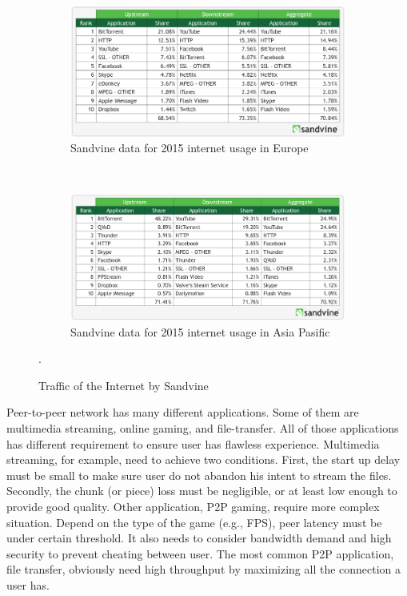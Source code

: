 \begin{figure}[h]
	\centering
	\begin{subfigure}[b]{0.8\textwidth}
		\includegraphics[width=\linewidth]{pics/sandvineeu2015}
		\caption{Sandvine data for 2015 internet usage in Europe}
		\label{fig:usage1}
	\end{subfigure}\\
	\begin{subfigure}[b]{0.8\textwidth}
		\includegraphics[width=\linewidth]{pics/sandvineasia2015}
		\caption{Sandvine data for 2015 internet usage in Asia Pasific}
		\label{fig:usage2}
	\end{subfigure}%
	\caption{Traffic of the Internet by Sandvine \cite{2015:internettraffic:sandvine}}.
	\label{fig:usage}
\end{figure}

Peer-to-peer network has many different applications. Some of them are multimedia streaming, online gaming, and file-transfer. All of those applications has different requirement to ensure user has flawless experience. Multimedia streaming, for example, need to achieve two conditions. First, the start up delay must be small to make sure user do not abandon his intent to stream the files. Secondly, the chunk (or piece) loss must be negligible, or at least low enough to provide good quality\cite{2008:givetogetvod:Mol}. Other application, P2P gaming, require more complex situation. Depend on the type of the game (e.g., FPS), peer latency must be under certain threshold\cite{2010:surveyp2pgame:shen}. It also needs to consider bandwidth demand and high security to prevent cheating between user. The most common P2P application, file transfer, obviously need high throughput by maximizing all the connection a user has.


